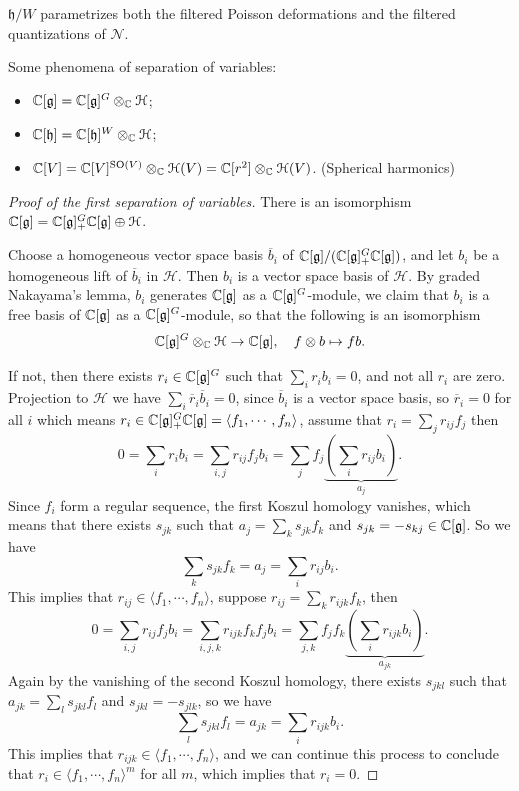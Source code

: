 \documentclass[12pt]{amsart}
\numberwithin{equation}{section}
\newcommand{\CH}{{\mathcal {H}}} \newcommand{\CI}{{\mathcal {I}}} \newcommand{\CJ}{{\mathcal {J}}}
\newcommand{\CN}{{\mathcal {N}}} \newcommand{\CO}{{\mathcal {O}}} \newcommand{\CP}{{\mathcal {P}}}
\newcommand{\fg}{\mathfrak{g}} \newcommand{\fh}{\mathfrak{h}} \newcommand{\fk}{\mathfrak{k}}
\renewcommand{\bar}{\overline}
\begin{document}
\begin{cor}
  $\fh/W$ parametrizes both the filtered Poisson deformations and the filtered quantizations of $\CN$.
\end{cor}



Some phenomena of separation of variables:
\begin{itemize}
  \item $\BC[\fg] = \BC[\fg]^G \otimes_{\BC} \CH$;
  \item $\BC[\fh] = \BC[\fh]^W \otimes_{\BC} \CH$;
  \item $\BC[V] = \BC[V]^{\SO(V)} \otimes_{\BC} \CH(V) = \BC[r^2] \otimes_{\BC} \CH(V)$. (Spherical harmonics)
\end{itemize}

\begin{proof}[Proof of the first separation of variables]
  There is an isomorphism $\BC[\fg] = \BC[\fg]^G_{+}\BC[\fg] \oplus \CH$.

  Choose a homogeneous vector space basis $\bar{b}_i$ of $\BC[\fg]/(\BC[\fg]^G_{+}\BC[\fg])$, and let $b_i$ be a homogeneous lift of $\bar{b}_i$ in $\CH$. Then $b_i$ is a vector space basis of $\CH$. By graded Nakayama's lemma, $b_i$ generates $\BC[\fg]$ as a $\BC[\fg]^G$-module, we claim that $b_i$ is a free basis of $\BC[\fg]$ as a $\BC[\fg]^G$-module, so that the following is an isomorphism
  \[
    \BC[\fg]^G \otimes_{\BC} \CH \to \BC[\fg], \quad f \otimes b \mapsto f b.
  \]

  If not, then there exists $r_i \in \BC[\fg]^G$ such that $\sum_{i} r_i b_i = 0$, and not all $r_i$ are zero. Projection to $\CH$ we have $\sum_{i} \bar{r}_i \bar{b}_i = 0$, since $\bar{b}_i$ is a vector space basis, so $\bar{r}_i = 0$ for all $i$ which means $r_i \in \BC[\fg]^G_{+}\BC[\fg] = \langle f_1, \cdots, f_n \rangle$, assume that $r_i = \sum_{j} r_{ij} f_j$ then
  \[
    0 = \sum_{i} r_i b_i = \sum_{i,j} r_{ij} f_j b_i = \sum_{j} f_j \underbrace{\left( \sum_{i} r_{ij} b_i \right)}_{a_j}.
  \]
  Since $f_i$ form a regular sequence, the first Koszul homology vanishes, which means that there exists $s_{jk}$ such that $a_j = \sum_{k} s_{jk} f_k $ and $s_{jk} = -s_{kj} \in \BC[\fg]$. So we have
  \[
    \sum_{k} s_{jk} f_k = a_j = \sum_{i} r_{ij} b_i.
  \]
  This implies that $r_{ij} \in \langle f_1, \cdots, f_n \rangle$, suppose $r_{ij} = \sum_{k} r_{ijk} f_k$, then
  \[
    0 = \sum_{i,j} r_{ij} f_j b_i = \sum_{i,j,k} r_{ijk} f_k f_j b_i = \sum_{j,k} f_j f_k \underbrace{\left( \sum_{i} r_{ijk} b_i \right)}_{a_{jk}}.
  \]
  Again by the vanishing of the second Koszul homology, there exists $s_{jkl}$ such that $a_{jk} = \sum_{l} s_{jkl} f_l$ and $s_{jkl} = -s_{jlk}$, so we have
  \[
    \sum_{l} s_{jkl} f_l = a_{jk} = \sum_{i} r_{ijk} b_i.
  \]
  This implies that $r_{ijk} \in \langle f_1, \cdots, f_n \rangle$, and we can continue this process to conclude that $r_i \in \langle f_1, \cdots, f_n \rangle^m$ for all $m$, which implies that $r_i = 0$.
\end{proof}
\end{document}
